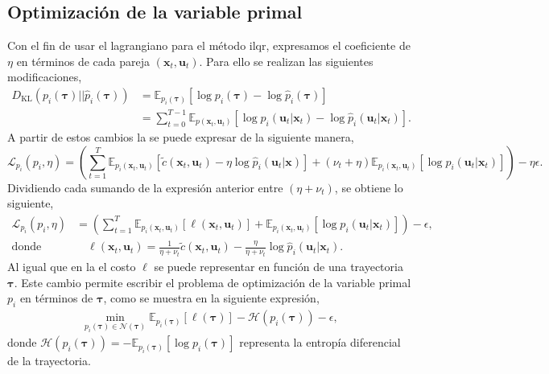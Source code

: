 \subsection{Optimización de la variable primal}
Con el fin de usar el lagrangiano  para el método \acrshort{ilqr}, expresamos el coeficiente de $\eta$ en términos de cada pareja $(\mathbf{x}_t, \mathbf{u}_t)$. Para ello se realizan las siguientes modificaciones, 
\begin{equation}
    \begin{aligned}
        D_{\text{KL}}(p_i(\bm \tau)||\hat p_{i}(\bm\tau)) &= \mathbb{E}_{p_{i}(\mathbf{\tau})}[\log p_{i}(\bm\tau) - \log \hat{p}_i(\bm \tau)] \\
        &= \sum_{t=0}^{T-1} \mathbb{E}_{p(\mathbf{x}_t, \mathbf{u}_t)}[\log p_{i}(\mathbf{u}_t |\mathbf{x}_t) - \log \hat{p}_i(\mathbf{u}_t | \mathbf{x}_t)].
    \end{aligned}
\end{equation}
A partir de estos cambios la  se puede expresar de la siguiente manera, 
\begin{equation}
    \mathcal{L}_{p_i}(p_i, \eta) = \left(\sum_{t=1}^{T}\mathbb{E}_{p_i(\mathbf{x}_t, \mathbf{u}_t)}\left[\tilde{c}(\mathbf{x}_t, \mathbf{u}_t) - \eta \log\hat{p}_i(\mathbf{u}_t|\mathbf{x})\right]+ (\nu_t + \eta)\mathbb{E}_{p_i(\mathbf{x}_t, \mathbf{u}_t)}[\log p_i(\mathbf{u}_t | \mathbf{x}_t)]\right) - \eta \epsilon.
\end{equation}
Dividiendo cada sumando de la expresión anterior entre $(\eta + \nu_t)$, se obtiene lo siguiente, 
\begin{align}
    \mathcal{L}_{p_i}(p_i, \eta) &= \left(\sum_{t=1}^{T} \mathbb{E}_{p_i(\mathbf{x}_t, \mathbf{u}_t)}\left[\ell(\mathbf{x}_t, \mathbf{u}_t)\right] + \mathbb{E}_{p_i(\mathbf{x}_t, \mathbf{u}_t)}[\log p_i(\mathbf{u}_t | \mathbf{x}_t)] \right)  - \epsilon, \label{eq:lagrange_p_eta}\\
    \text{donde } & \quad \ell(\mathbf{x}_t, \mathbf{u}_t) =\frac{1}{\eta + \nu_t}\tilde{c}(\mathbf{x}_t, \mathbf{u}_t) - \frac{\eta}{\eta + \nu_t}\log\hat{p}_i(\mathbf{u}_t|\mathbf{x}_t).
    \label{eq:cost_eta}
    \end{align}
Al igual que en la  el costo $\ell$ se puede representar en función de una trayectoria $\bm\tau$. Este cambio permite escribir el problema de optimización de la variable primal $p_i$ en términos de $\bm\tau$, como se muestra en la siguiente expresión, 
\begin{align}
    \min_{p_i(\bm\tau)\in \mathcal{N}(\bm\tau)}
    \mathbb{E}_{p_i(\bm \tau)}[\ell(\bm \tau)] - \mathcal{H}(p_i(\bm\tau)) - \epsilon,
    \label{eq:traj_opt}
\end{align}
donde $\mathcal{H}(p_i(\bm\tau)) =-\mathbb{E}_{p_i(\bm\tau)}[\log p_i(\bm\tau)]$ representa la entropía diferencial de la trayectoria.

